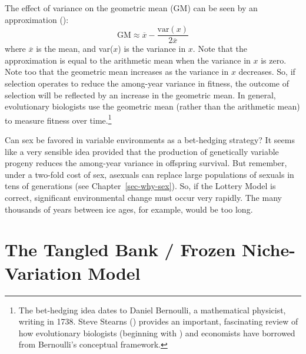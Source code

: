 \documentclass[
  letterpaper,
]{book}
\begin{document}
The effect of variance on the geometric mean (GM) can be seen by an
approximation ():\[\text{GM} \approx \overline{x} - \frac{\text{var}(x)}{2\overline{x}}\]
where \(\overline{x}\) is the mean, and var(\(x\)) is the variance in
\(x\). Note that the approximation is equal to the arithmetic mean when
the variance in \(x\) is zero. Note too that the geometric mean
increases as the variance in \(x\) decreases. So, if selection operates
to reduce the among-year variance in fitness, the outcome of selection
will be reflected by an increase in the geometric mean. In general,
evolutionary biologists use the geometric mean (rather than the
arithmetic mean) to measure fitness over time.\footnote{The bet-hedging
  idea dates to Daniel Bernoulli, a mathematical physicist, writing in
  1738. Steve Stearns () provides an
  important, fascinating review of how evolutionary biologists
  (beginning with ) and economists
  have borrowed from Bernoulli's conceptual framework.}

Can sex be favored in variable environments as a bet-hedging strategy?
It seems like a very sensible idea provided that the production of
genetically variable progeny reduces the among-year variance in
offspring survival. But remember, under a two-fold cost of sex, asexuals
can replace large populations of sexuals in tens of generations (see
Chapter~\ref{sec-why-sex}). So, if the Lottery Model is correct,
significant environmental change must occur very rapidly. The many
thousands of years between ice ages, for example, would be too long.

\section{The Tangled Bank / Frozen Niche-Variation
Model}\label{sec-niche}
\end{document}
